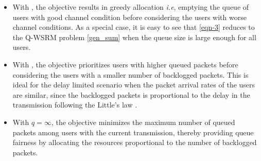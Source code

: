 \begin{itemize}
\item With , the objective results in greedy allocation \textit{i.e}, emptying the queue of users with good channel condition before considering the users with worse channel conditions. As a special case, it is easy to see that \eqref{eqn-3} reduces to the \ac{Q-WSRM} problem \eqref{gen_sum} when the queue size is large enough for all users.
\item With , the objective prioritizes users with higher queued packets before considering the users with a smaller number of backlogged packets. This is ideal for the delay limited scenario when the packet arrival rates of the users are similar, since the backlogged packets is proportional to the delay in the transmission following the Little's law \cite{neely2010stochastic}.
\item With \(q = \infty \), the objective minimizes the maximum number of queued packets among users with the current transmission, thereby providing queue fairness by allocating the resources proportional to the number of backlogged packets.
\end{itemize}
